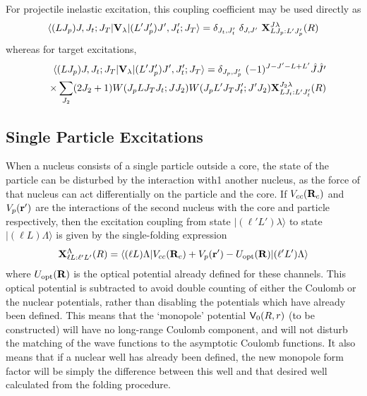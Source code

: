 \documentclass[11pt,a4paper]{article}
\newcommand{\vecr}{{\bf r}}
\newcommand{\vecR}{{\bf R}}
\newcommand{\Vee}{{\sf V}}
\begin{document}
For projectile inelastic excitation, this coupling coefficient may be used
directly as
\begin{eqnarray}
\langle (L J_p)J, J_t ; J_T | {\bf V}_\lambda |
    (L' J'_ p)J' , J'_ t ; J_T\rangle
=
 \delta_{J_t , J'_ t} ~\delta_{J , J'} ~
 {\bf X}^{J \lambda}_{LJ_p :L' J'_ p} (R)
\end{eqnarray}
whereas for target excitations,
\begin{eqnarray}
\nonumber
&&\langle (L J_p)J, J_t ; J_T | {\bf V}_\lambda |
    (L' J'_ p)J' , J'_ t ; J_T\rangle
=
  \delta_{J_p , J'_ p} ~
  (-1)^{J-J' -L+L'} \hat J \hat {J'}
\\
&& \times \sum_{J_2}    (2J_2 + 1)
      W(J_p L     J_T J    _t ; J     J_2)
      W(J_p L' J_T J'_ t ; J' J_2)
      {\bf X}^{J_2 \lambda}_{LJ_t :L' J'_ t} (R)
\end{eqnarray}
\subsection{Single Particle Excitations}

When a nucleus consists of a single particle outside a core,
the state of the particle can be disturbed by the interaction with1
another nucleus, as the force of that nucleus can act differentially
on the particle and the core.
If $V_{cc} (\vecR_c)$ and $ V_p (\vecr') $
are the interactions of the second nucleus with the
core and particle respectively,
then the excitation coupling from state
$| (\ell' L') \lambda\rangle$ to state
$| (\ell L) \Lambda\rangle$ is given by the single-folding expression
\begin{eqnarray}
\BX^\Lambda_{\ell L: \ell' L'} (R) =
\langle (\ell L) \Lambda
     | V_{cc} (\vecR_c) + V_p (\vecr') - U_{\rm opt} (\vecR) |
    (\ell' L') \Lambda\rangle
\end{eqnarray}
where $U_{\rm opt} (\vecR) $ is the optical potential already defined for
these channels.
This optical potential is subtracted to avoid double counting of either
the Coulomb or the nuclear potentials,
rather than disabling the potentials which have already been defined.
This means that the `monopole' potential $ \Vee_0 (R,r) $
(to be constructed) will have no long-range Coulomb component,
and will not disturb the matching of the wave functions to the
asymptotic Coulomb functions.
It also means that if a nuclear well has already been defined,
the new monopole form factor will be simply the difference between this well
and that desired well calculated from the folding procedure.
\end{document}
